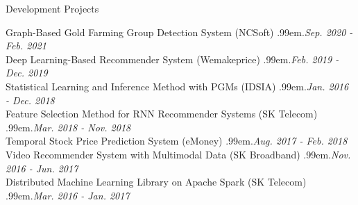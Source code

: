 \documentclass{resume} %
\makeatletter
\newcommand \Dotfill {\leavevmode \cleaders \hb@xt@ .99em{\hss .\hss }\hfill \kern \z@}
\makeatother
\begin{document}

\begin{rSection}{Development Projects}

Graph-Based Gold Farming Group Detection System (NCSoft) \smallskip \Dotfill \emph{Sep. 2020 - Feb. 2021} \\ 
Deep Learning-Based Recommender System (Wemakeprice) \smallskip \Dotfill \emph{Feb. 2019 - Dec. 2019} \\ 
Statistical Learning and Inference Method with PGMs (IDSIA) \smallskip \Dotfill \emph{Jan. 2016 - Dec. 2018} \\ 
Feature Selection Method for RNN Recommender Systems (SK Telecom) \smallskip \Dotfill \emph{Mar. 2018 - Nov. 2018} \\ 
Temporal Stock Price Prediction System (eMoney) \smallskip \Dotfill \emph{Aug. 2017 - Feb. 2018} \\ 
Video Recommender System with Multimodal Data (SK Broadband) \smallskip \Dotfill \emph{Nov. 2016 - Jun. 2017} \\ 
Distributed Machine Learning Library on Apache Spark (SK Telecom) \smallskip \Dotfill \emph{Mar. 2016 - Jan. 2017}

\end{rSection}

\end{document}
